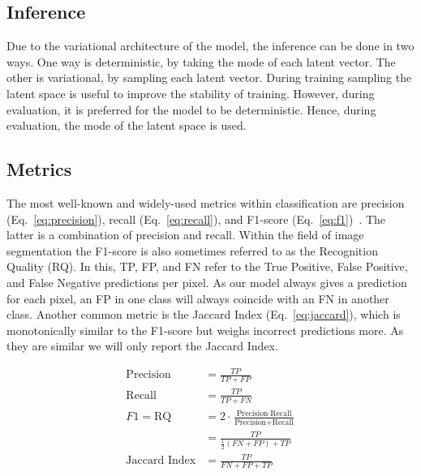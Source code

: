 \subsection{Inference}
Due to the variational architecture of the model, the inference can be done in two ways. One way is deterministic, by taking the mode of each latent vector. The other is variational, by sampling each latent vector. During training sampling the latent space is useful to improve the stability of training. However, during evaluation, it is preferred for the model to be deterministic. Hence, during evaluation, the mode of the latent space is used.

\subsection{Metrics}
The most well-known and widely-used metrics within classification are precision (Eq.~\ref{eq:precision}), recall (Eq.~\ref{eq:recall}), and F1-score (Eq.~\ref{eq:f1})~\cite{rijsbergen1979information}. The latter is a combination of precision and recall. Within the field of image segmentation the F1-score is also sometimes referred to as the Recognition Quality (RQ). In this, TP, FP, and FN refer to the True Positive, False Positive, and False Negative predictions per pixel. As our model always gives a prediction for each pixel, an FP in one class will always coincide with an FN in another class. Another common metric is the Jaccard Index (Eq.~\ref{eq:jaccard}), which is monotonically similar to the F1-score but weighs incorrect predictions more. As they are similar we will only report the Jaccard Index.

\begin{subequations}
    \begin{align}
        \text{Precision}     & = \frac{TP}{TP + FP} \label{eq:precision}                                               \\
        \text{Recall}        & = \frac{TP}{TP + FN} \label{eq:recall}                                                  \\
        F1 = \text{RQ}       & = 2 \cdot \frac{\text{Precision} \cdot \text{Recall}}{\text{Precision} + \text{Recall}} \\ 
                             & = \frac{TP}{\frac{1}{2} (FN + FP) + TP} \label{eq:f1}                                   \\
        \text{Jaccard Index} & = \frac{TP}{FN + FP + TP} \label{eq:jaccard}
    \end{align}
\end{subequations}
